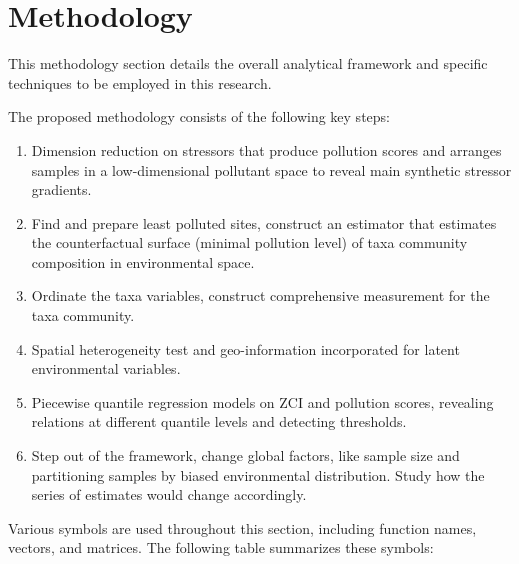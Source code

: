 \section{Methodology}

This methodology section details the overall analytical framework and specific techniques to be employed in this research.

The proposed methodology consists of the following key steps:

\begin{enumerate}
\item Dimension reduction on stressors that produce pollution scores and arranges samples in a low-dimensional pollutant space to reveal main synthetic stressor gradients.

\item Find and prepare least polluted sites, construct an estimator that estimates the counterfactual surface (minimal pollution level) of taxa community composition in environmental space.

\item Ordinate the taxa variables, construct comprehensive measurement for the taxa community.

\item Spatial heterogeneity test and geo-information incorporated for latent environmental variables.

\item Piecewise quantile regression models on ZCI and pollution scores, revealing relations at different quantile levels and detecting thresholds.

\item Step out of the framework, change global factors, like sample size and partitioning samples by biased environmental distribution. Study how the series of estimates would change accordingly.
\end{enumerate}

Various symbols are used throughout this section, including function names, vectors, and matrices. The following table summarizes these symbols:

